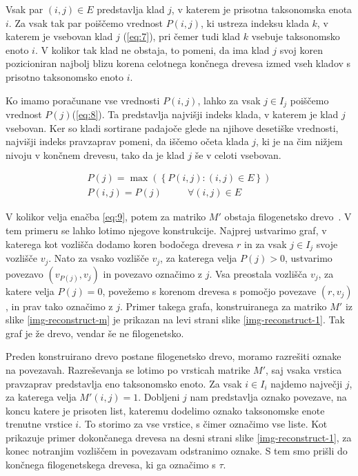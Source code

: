\documentclass[a4paper, 12pt]{book}
\begin{document}
Vsak par $(i, j) \in E$ predstavlja klad $j$, v katerem je prisotna taksonomska enota $i$. Za vsak tak par poiščemo vrednost $P(i, j)$, ki ustreza indeksu klada $k$, v katerem je vsebovan klad $j$ (\ref{eq:7}), pri čemer tudi klad $k$ vsebuje taksonomsko enoto $i$. V kolikor tak klad ne obstaja, to pomeni, da ima klad $j$ svoj koren pozicioniran najbolj blizu korena celotnega končnega drevesa izmed vseh kladov s prisotno taksonomsko enoto $i$. 

Ko imamo poračunane vse vrednosti $P(i, j)$, lahko za vsak $j \in I_j$ poiščemo vrednost $P(j)$(\ref{eq:8}). Ta predstavlja najvišji indeks klada, v katerem je klad $j$ vsebovan. Ker so kladi sortirane padajoče glede na njihove desetiške vrednosti, najvišji indeks pravzaprav pomeni, da iščemo očeta klada $j$, ki je na čim nižjem nivoju v končnem drevesu, tako da je klad $j$ še v celoti vsebovan.
	
\begin{align}
	P(j) = \max(\left\{P(i, j): (i, j) \in E\right\}) \label{eq:8} \\
	P(i, j) = P(j)   ~~~~~~~~~~~~  \forall (i, j) \in E \label{eq:9}
\end{align}

V kolikor velja enačba \ref{eq:9}, potem za matriko $M'$ obstaja filogenetsko drevo~\cite{gd}. V tem primeru se lahko lotimo njegove konstrukcije. Najprej ustvarimo graf, v katerega kot vozlišča dodamo koren bodočega drevesa $r$ in za vsak $j \in I_j$ svoje vozlišče $v_j$. Nato za vsako vozlišče $v_j$, za katerega velja $P(j) > 0$, ustvarimo povezavo $(v_{P(j)}, v_j)$ in povezavo označimo z $j$. Vsa preostala vozlišča $v_j$, za katere velja $P(j) = 0$, povežemo s korenom drevesa s pomočjo povezave $(r, v_j)$, in prav tako označimo z $j$. Primer takega grafa, konstruiranega za matriko $M'$ iz slike \ref{img-reconstruct-m} je prikazan na levi strani slike \ref{img-reconstruct-1}. Tak graf je že drevo, vendar še ne filogenetsko.

Preden konstruirano drevo postane filogenetsko drevo, moramo razrešiti oznake na povezavah. Razreševanja se lotimo po vrsticah matrike $M'$, saj vsaka vrstica pravzaprav predstavlja eno taksonomsko enoto. Za vsak $i \in I_i$ najdemo največji $j$, za katerega velja $M'(i, j) = 1$. Dobljeni $j$ nam predstavlja oznako povezave, na koncu katere je prisoten list, kateremu dodelimo oznako taksonomske enote trenutne vrstice $i$. To storimo za vse vrstice, s čimer označimo vse liste. Kot prikazuje primer dokončanega drevesa na desni strani slike \ref{img-reconstruct-1}, za konec notranjim vozliščem in povezavam odstranimo oznake. S tem smo prišli do končnega filogenetskega drevesa, ki ga označimo s $\tau$.  
\end{document}
